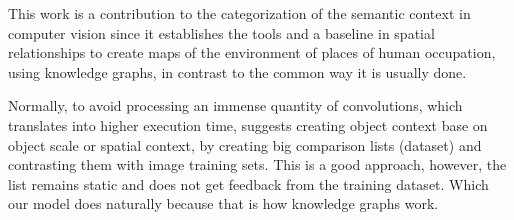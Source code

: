 
This work is a contribution to the categorization of the semantic context in 
computer vision since it establishes the tools and a baseline in spatial 
relationships to create maps of the environment of places of human occupation, 
using knowledge graphs, in contrast to the common way it is usually done.

Normally, to avoid processing an immense quantity of convolutions, which 
translates into higher execution time, \cite{Galleguillos} suggests creating 
object context base on object scale or spatial context, by creating big 
comparison lists (dataset) and contrasting them with image training sets. 
This is a good approach, however, the list remains static and does not get 
feedback from the training dataset. Which our model does naturally because 
that is how knowledge graphs work.